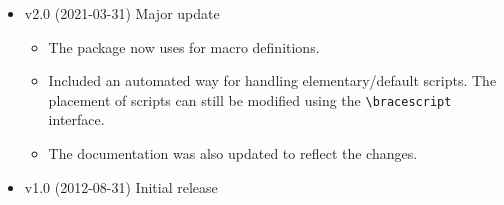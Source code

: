 \documentclass[10pt]{ltxdockit}[2011/03/25]
\begin{document}
\begin{itemize}
  \item v2.0 (2021-03-31) Major update
  
  \begin{itemize}
    \item
    The package now uses \href{http://ctan.org/pkg/xparse}{} for macro definitions.
    
    \item
    Included an automated way for handling elementary/default scripts. The placement of scripts can still be modified using the \lstinline|\bracescript| interface.
    
    \item
    The documentation was also updated to reflect the changes.
  \end{itemize}
  
  \item v1.0 (2012-08-31) Initial release
\end{itemize}
\end{document}
